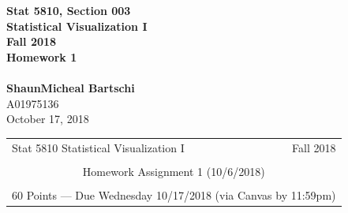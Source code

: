 \documentclass[12pt,letterpaper,final]{article}
\begin{document}


\begin{titlepage}
\vspace*{4.5cm}
\begin{center}
{\LARGE \bf Stat 5810, Section 003} \\[0.5cm]
{\LARGE \bf Statistical Visualization I} \\[0.5cm]
{\LARGE \bf Fall 2018} \\[0.5cm]
{\LARGE \bf Homework 1} \\[0.5cm]
~ \\[2cm]
{\bf ShaunMicheal Bartschi} \\[0.3cm]
{A01975136} \\[0.3cm]
{October 17, 2018} \\[0.3cm]
\end{center}

\thispagestyle{empty}
\vfill
\end{titlepage}


\begin{table}\centering
\begin{tabular*}{6.15in}{@{\extracolsep{\fill}}|llr|} \hline
Stat 5810 Statistical Visualization I & \hspace*{0.5 in} & Fall 2018 \\
 & & \\
\multicolumn{3}{|c|}{
Homework Assignment 1 (10/6/2018)} \\
 & & \\
\multicolumn{3}{|c|}{
60 Points --- Due Wednesday 10/17/2018 (via Canvas by 11:59pm)} \\
\hline
\end{tabular*}
\end{table}
\end{document}
